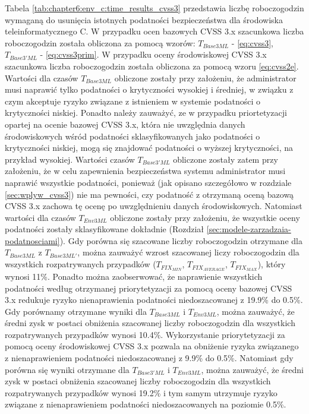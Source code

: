 \bigbreak
Tabela \ref{tab:chapter6:env_c:time_results_cvss3} przedstawia liczbę roboczogodzin wymaganą do usunięcia istotnych podatności bezpieczeństwa dla środowiska teleinformatycznego C. W przypadku ocen bazowych CVSS 3.x szacunkowa liczba roboczogodzin została obliczona za pomocą wzorów: $T_{Base3ML}$ - \ref{eq:cvss3}, $T_{Base3'ML}$ - \ref{eq:cvss3prim}. W przypadku oceny środowiskowej CVSS 3.x szacunkowa liczba roboczogodzin została obliczona za pomocą wzoru \ref{eq:cvss2e}. Wartości dla czasów $T_{Base3ML}$ obliczone zostały przy założeniu, że administrator musi naprawić tylko podatności o krytyczności wysokiej i średniej, w związku z czym akceptuje ryzyko związane z istnieniem w systemie podatności o krytyczności niskiej. Ponadto należy zauważyć, ze w przypadku priortetyzacji opartej na ocenie bazowej CVSS 3.x, która nie uwzględnia danych środowiskowych wśród podatności sklasyfikowanych jako podatności o krytyczności niskiej, mogą się znajdować podatności o wyższej krytyczności, na przykład wysokiej. Wartości czasów $T_{Base3'ML}$ obliczone zostały zatem przy założeniu, że w celu zapewnienia bezpieczeństwa systemu administrator musi naprawić wszystkie podatności, ponieważ (jak opisano szczegółowo w rozdziale \ref{sec:wplyw_cvss3}) nie ma pewności, czy podatność z otrzymaną oceną bazową CVSS 3.x zachowa tę ocenę po uwzględnieniu danych środowiskowych. Natomiast wartości dla czasów $T_{Env3ML}$ obliczone zostały przy założeniu, że wszystkie oceny podatności zostały sklasyfikowane dokładnie (Rozdział \ref{sec:modele-zarzadzaia-podatnosciami}). Gdy porówna się szacowane liczby roboczogodzin otrzymane dla $T_{Base3ML}$ z $T_{Base3ML'}$, można zauważyć wzrost szacowanej liczy roboczogodzin dla wszystkich rozpatrywanych przypadków ($T_{FIX_{MIN}}$, $T_{FIX_{AVERAGE}}$, $T_{FIX_{MAX}}$), który wynosi 11\%. Ponadto można zaobserwować, że naprawienie wszystkich podatności według otrzymanej priorytetyzacji za pomocą oceny bazowej CVSS 3.x redukuje ryzyko nienaprawienia podatności niedoszacowanej z 19.9\% do 0.5\%. Gdy porównamy otrzymane wyniki dla $T_{Base3ML}$ i $T_{Env3ML}$, można zauważyć, że średni zysk w postaci obniżenia szacowanej liczby roboczogodzin dla wszystkich rozpatrywanych przypadków wynosi 10.4\%. Wykorzystanie priorytetyzacji za pomocą oceny środowiskowej CVSS 3.x pozwala na obniżenie ryzyka związanego z nienaprawieniem podatności niedoszacowanej z 9.9\% do 0.5\%. Natomiast gdy porówna się wyniki otrzymane dla $T_{Base3'ML}$ i $T_{Env3ML}$, można zauważyć, że średni zysk w postaci obniżenia szacowanej liczby roboczogodzin dla wszystkich rozpatrywanych przypadków wynosi 19.2\% i tym samym utrzymuje ryzyko związane z nienaprawieniem podatności niedoszacowanych na poziomie 0.5\%.

